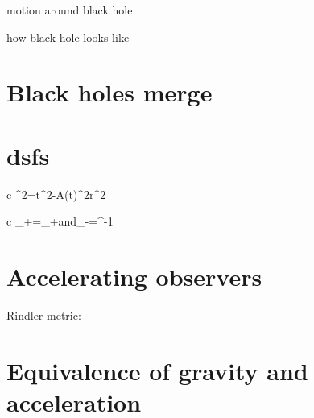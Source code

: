 \documentclass[11pt,oneside%
]{memoir}
\newenvironment{eqna}{\begin{IEEEeqnarray*}{c}}{\end{IEEEeqnarray*}\ignorespacesafterend}
\newcommand{\andd}{\qquad\textrm{and}\qquad}
\newcommand{\dd}{\mathrm{d}}
\begin{document}
motion around black hole

how black hole looks like

\section{Black holes merge}

\section{dsfs}

\begin{eqna}
\dd\tau^2=\dd t^2-A(t)^2\dd r^2
\end{eqna}

\begin{eqna}
\sigma_+\rightarrow\tilde{\sigma_+}=\eta\sigma_+\andd\sigma_-\rightarrow\tilde{\sigma_+}=\eta^{-1}\sigma
\end{eqna}

\section{Accelerating observers}

Rindler metric:



\section{Equivalence of gravity and acceleration}








\end{document}
